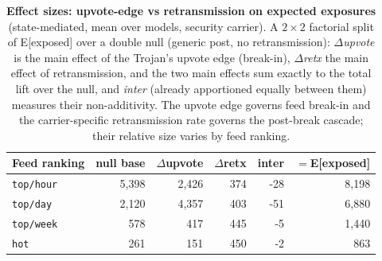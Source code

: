 \begin{table}[t]\centering\small
\caption{\textbf{Effect sizes: upvote-edge vs retransmission on expected exposures} (state-mediated, mean over models, security carrier). A $2{\times}2$ factorial split of E[exposed] over a double null (generic post, no retransmission): $\Delta$\emph{upvote} is the main effect of the Trojan's upvote edge (break-in), $\Delta$\emph{retx} the main effect of retransmission, and the two main effects sum exactly to the total lift over the null, and \emph{inter} (already apportioned equally between them) measures their non-additivity. The upvote edge governs feed break-in and the carrier-specific retransmission rate governs the post-break cascade; their relative size varies by feed ranking.}
\label{tab:expexp-decomp}
\begin{tabular}{@{}l r r r r r@{}}
\toprule
Feed ranking & null base & $\Delta$upvote & $\Delta$retx & inter & $=$E[exposed]\\
\midrule
\texttt{top/hour} & 5{,}398 & 2{,}426 & 374 & -28 & 8{,}198\\
\texttt{top/day} & 2{,}120 & 4{,}357 & 403 & -51 & 6{,}880\\
\texttt{top/week} & 578 & 417 & 445 & -5 & 1{,}440\\
\texttt{hot} & 261 & 151 & 450 & -2 & 863\\
\bottomrule
\end{tabular}
\end{table}
